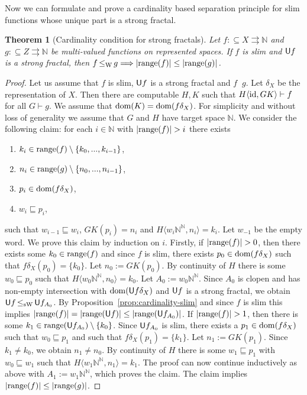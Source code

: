 \documentclass[a4paper]{amsart}
\def\IN{{\mathbb{N}}}
\def\TO{\Longrightarrow}
\def\In{\subseteq}
\def\prefix{\sqsubseteq}
\def\mto{\rightrightarrows}
\def\id{{\rm id}}
\def\dom{{\rm dom}}
\def\range{{\rm range}}
\def\U{\text{\rm\sffamily U}}
\def\leqW{\mathop{\leq_{\mathrm{W}}}}
\def\leqSW{\mathop{\leq_{\mathrm{sW}}}}
\newtheorem{theorem}{Theorem}[section]
\theoremstyle{definition}
\begin{document}
Now we can formulate and prove a cardinality based separation principle for 
slim functions whose unique part is a strong fractal.

\begin{theorem}[Cardinality condition for strong fractals]
\label{thm:cardinality-strong-fractals}
Let $f:\In X\mto\IN$ and $g:\In Z\mto\IN$ be multi-valued functions on represented spaces.
If $f$ is slim and $\U f$ is a strong fractal, 
then $f\leqW g\TO|\range(f)|\leq|\range(g)|$.
\end{theorem}
\begin{proof}
Let us assume that $f$ is slim, $\U f$ is a strong fractal and $f\leqW g$.
Let $\delta_X$ be the representation of $X$.
Then there are computable $H,K$ such that $H\langle\id,GK\rangle\vdash f$ for all $G\vdash g$.
We assume that $\dom(K)=\dom(f\delta_X)$.
For simplicity and without loss of generality we assume that $G$ and $H$ have target space $\IN$.
We consider the following claim: for each $i\in\IN$ with $|\range(f)|>i$ 
there exists 
\begin{enumerate}
\item $k_i\in\range(f)\setminus\{k_0,...,k_{i-1}\}$,
\item $n_i\in\range(g)\setminus\{n_0,...,n_{i-1}\}$,
\item $p_i\in\dom(f\delta_X)$, 
\item $w_i\prefix p_i$, 
\end{enumerate}
such that $w_{i-1}\prefix w_i$, $GK(p_i)=n_i$ and $H\langle w_i\IN^\IN,n_i\rangle=k_i$.
Let $w_{-1}$ be the empty word. 
We prove this claim by induction on $i$. 
Firstly, if $|\range(f)|>0$, then there exists some $k_0\in\range(f)$ and since $f$ is slim, 
there exists $p_0\in\dom(f\delta_X)$ such that $f\delta_X(p_0)=\{k_0\}$. Let $n_0:=GK(p_0)$. 
By continuity of $H$ there is some $w_0\prefix p_0$
such that $H\langle w_0\IN^\IN,n_0\rangle=k_0$. Let $A_0:=w_0\IN^\IN$. 
Since $A_0$ is clopen and has non-empty intersection with $\dom(\U f\delta_X)$ and $\U f$ is a strong fractal, 
we obtain $\U f\leqSW\U f_{A_0}$. By Proposition~\ref{prop:cardinality-slim} and since $f$ is slim this implies
$|\range(f)|=|\range(\U f)|\leq|\range(\U f_{A_0})|$. 
If $|\range(f)|>1$, then there is some $k_1\in\range(\U f_{A_0})\setminus\{k_0\}$.
Since $\U f_{A_0}$ is slim, there exists a $p_1\in\dom(f\delta_X)$ such that $w_0\prefix p_1$ and such that
$f\delta_X(p_1)=\{k_1\}$. Let $n_1:=GK(p_1)$. Since $k_1\not=k_0$, we obtain $n_1\not=n_0$.
By continuity of $H$ there is some $w_1\prefix p_1$ with $w_0\prefix w_1$
such that $H\langle w_1\IN^\IN,n_1\rangle=k_1$. 
The proof can now continue inductively as above with $A_1:=w_1\IN^\IN$,
which proves the claim.
The claim implies $|\range(f)|\leq|\range(g)|$.
\end{proof}
\end{document}
